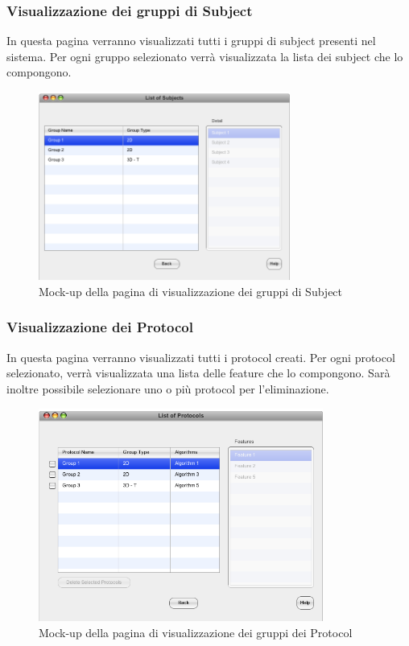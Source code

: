 \subsubsection{Visualizzazione dei gruppi di Subject}
In questa pagina verranno visualizzati tutti i gruppi di subject\glossario{} presenti nel sistema. Per ogni gruppo selezionato verrà visualizzata la lista dei subject\glossario{} che lo compongono.
\begin{figure}[htp]
	\centering
	\includegraphics[width=0.75\linewidth,height=6.2cm]{./Content/Immagini/Prototype-v0.1/filesystemdoc_8_5}
	\caption{Mock-up della pagina di visualizzazione dei gruppi di Subject}
	\label{view_group}
\end{figure}

\subsubsection{Visualizzazione dei Protocol}
In questa pagina verranno visualizzati tutti i protocol\glossario{} creati. Per ogni protocol selezionato, verrà visualizzata una lista delle feature\glossario{} che lo compongono.
Sarà inoltre possibile selezionare uno o più protocol\glossario{} per l'eliminazione.
\begin{figure}[htp]
	\centering
	\includegraphics[width=0.8\linewidth,height=7cm]{./Content/Immagini/Prototype-v0.1/filesystemdoc_8_7}
	\caption{Mock-up della pagina di visualizzazione dei gruppi dei Protocol}
	\label{view_protocol}
\end{figure}

